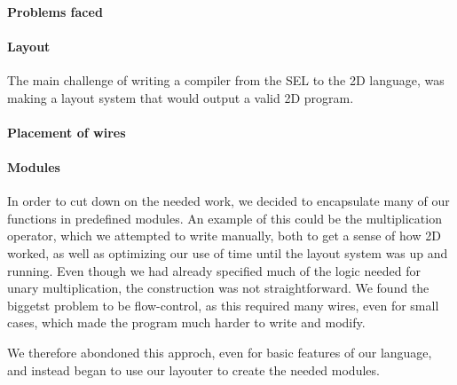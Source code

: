

\paragraph{Problems faced}
\label{compiler:problems}

\paragraph{Layout}
\label{compiler:layout}
The main challenge of writing a compiler from the SEL to the 2D
language, was making a layout system that would output a valid 2D program.

\paragraph{Placement of wires}
\label{compiler:placement}


\paragraph{Modules}
\label{compiler:modules}
In order to cut down on the needed work, we decided to encapsulate
many of our functions in predefined modules. An example of this could
be the multiplication operator, which we attempted to write manually,
both to get a sense of how 2D worked, as well as optimizing our use of
time until the layout system was up and running. Even though we had
already specified much of the logic needed for unary multiplication,
the construction was not straightforward. We found the biggetst
problem to be flow-control, as this required many wires, even for
small cases, which made the program much harder to write and modify.

We therefore abondoned this approch, even for basic features of our
language, and instead began to use our layouter to create the needed
modules.


